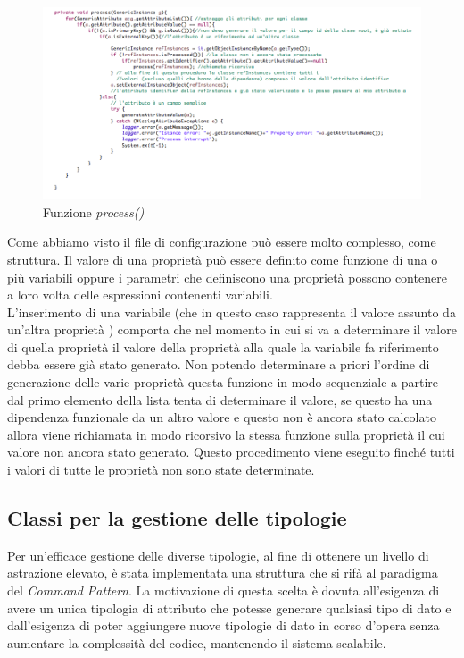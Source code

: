 \documentclass[12pt,a4paper,italian]{article}
\begin{document}
		\begin{figure}[h!]
			\centering
			\includegraphics[width=14cm]{img/process.png}
			\caption{Funzione \emph{process()}}\label{process}
		\end{figure}
		
		Come abbiamo visto il file di configurazione può essere molto complesso, come struttura. Il valore di una proprietà può essere definito come funzione di una o più variabili oppure i parametri che definiscono una proprietà possono contenere a loro volta delle espressioni contenenti variabili.\\L'inserimento di una variabile (che in questo caso rappresenta il valore assunto da un'altra proprietà ) comporta che nel momento in cui si va a determinare il valore di quella proprietà  il valore  della proprietà alla quale la variabile fa riferimento debba essere già stato generato. Non potendo determinare a priori l'ordine di generazione delle varie proprietà questa funzione in modo sequenziale a partire dal primo elemento della lista tenta di determinare il valore, se questo ha una dipendenza funzionale da un altro valore e questo non è ancora stato calcolato allora viene richiamata in modo ricorsivo la stessa funzione sulla proprietà il cui valore non ancora stato generato. Questo procedimento viene eseguito finché tutti i valori di tutte le proprietà non sono state determinate. 
		
		\subsection{Classi per la gestione delle tipologie}
		
		Per un'efficace gestione delle diverse tipologie, al fine di ottenere un livello di astrazione elevato, è stata implementata una struttura che si rifà al paradigma del \emph{Command Pattern}. La motivazione di questa scelta è dovuta all'esigenza di avere un unica tipologia di attributo che potesse generare qualsiasi tipo di dato e dall'esigenza di poter aggiungere nuove tipologie di dato in corso d'opera senza aumentare la complessità del codice, mantenendo il sistema scalabile.
		
\end{document}
